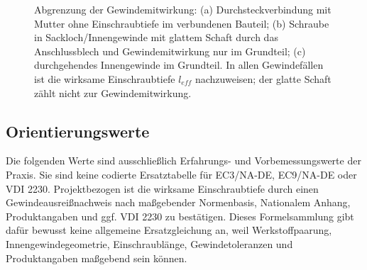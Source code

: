 \documentclass[10pt,a4paper]{article}
\newcommand{\drawWasher}[4]{%
  \pgfmathsetmacro{\wxl}{#1-#3/2}%
  \pgfmathsetmacro{\wxr}{#1+#3/2}%
  \pgfmathsetmacro{\wyt}{#2+#4}%
  \path[fill=gray!45,draw=black,thick] (\wxl,#2) rectangle (\wxr,\wyt);%
}
\newcommand{\drawHexFastener}[4]{%
  \pgfmathsetmacro{\hxl}{#1-#3/2}%
  \pgfmathsetmacro{\hxr}{#1+#3/2}%
  \pgfmathsetmacro{\hyt}{#2+#4}%
  \pgfmathsetmacro{\bev}{#4*0.22}%
  \pgfmathsetmacro{\fl}{\hxl+0.22*#3}%
  \pgfmathsetmacro{\fr}{\hxr-0.22*#3}%
  \path[fill=gray!70,draw=black,thick]
    (\hxl+\bev,#2) -- (\hxr-\bev,#2) --
    (\hxr,#2+0.20*#4) -- (\hxr,#2+0.80*#4) --
    (\hxr-\bev,\hyt) -- (\hxl+\bev,\hyt) --
    (\hxl,#2+0.80*#4) -- (\hxl,#2+0.20*#4) -- cycle;%
  \draw[black,thick] (\fl,#2+0.04*#4) -- (\fl,\hyt-0.04*#4);%
  \draw[black,thick] (\fr,#2+0.04*#4) -- (\fr,\hyt-0.04*#4);%
  \draw[black!45,thin] (\hxl+\bev,#2+0.04*#4) -- (\fl,#2+0.04*#4);%
  \draw[black!45,thin] (\fr,#2+0.04*#4) -- (\hxr-\bev,#2+0.04*#4);%
}
\begin{document}
\begin{figure}[H]
\caption{Abgrenzung der Gewindemitwirkung: (a) Durchsteckverbindung mit Mutter ohne Einschraubtiefe im verbundenen Bauteil; (b) Schraube in Sackloch/Innengewinde mit glattem Schaft durch das Anschlussblech und Gewindemitwirkung nur im Grundteil; (c) durchgehendes Innengewinde im Grundteil. In allen Gewindefällen ist die wirksame Einschraubtiefe $l_{eff}$ nachzuweisen; der glatte Schaft zählt nicht zur Gewindemitwirkung.}
\end{figure}

\subsection{Orientierungswerte}
\begin{hinweisbox}
Die folgenden Werte sind ausschließlich Erfahrungs- und Vorbemessungswerte der Praxis. Sie sind keine codierte Ersatztabelle für EC3/NA-DE, EC9/NA-DE oder VDI 2230. Projektbezogen ist die wirksame Einschraubtiefe durch einen Gewindeausreißnachweis nach maßgebender Normenbasis, Nationalem Anhang, Produktangaben und ggf. VDI 2230 zu bestätigen. Dieses Formelsammlung gibt dafür bewusst keine allgemeine Ersatzgleichung an, weil Werkstoffpaarung, Innengewindegeometrie, Einschraublänge, Gewindetoleranzen und Produktangaben maßgebend sein können.
\end{hinweisbox}
\end{document}
